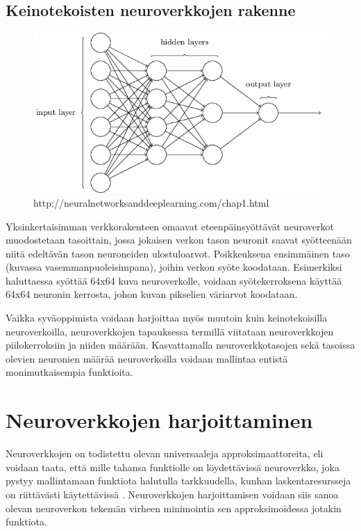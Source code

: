 \documentclass[finnish]{tktltiki2}
\theoremstyle{definition}
\theoremstyle{remark}
\begin{document}
  \subsection{Keinotekoisten neuroverkkojen rakenne}

  \begin{figure}[h]
  \label{pic:neuralnet}
  \centering
  \includegraphics[scale=0.5]{basic-neuralnet}
  \caption{http://neuralnetworksanddeeplearning.com/chap1.html}
  \end{figure}

  Yksinkertaisimman verkkorakenteen omaavat eteenpäinsyöttävät neuroverkot muodostetaan tasoittain, jossa jokaisen verkon tason neuronit saavat syötteenään niitä edeltävän tason neuroneiden ulostuloarvot. Poikkeuksena ensimmäinen taso (kuvassa vasemmanpuoleisimpana), joihin verkon syöte koodataan. Esimerkiksi haluttaessa syöttää 64x64 kuva neuroverkolle, voidaan syötekerroksena käyttää 64x64 neuronin kerrosta, johon kuvan pikselien väriarvot koodataan.

  Vaikka syväoppimista voidaan harjoittaa myös muutoin kuin keinotekoisilla neuroverkoilla, neuroverkkojen tapauksessa termillä viitataan neuroverkkojen piilokerroksiin ja niiden määrään. Kasvattamalla neuroverkkotasojen sekä tasoissa olevien neuronien määrää neuroverkoilla voidaan mallintaa entistä monimutkaisempia funktioita.

  \section{Neuroverkkojen harjoittaminen}

  Neuroverkkojen on todistettu olevan universaaleja approksimaattoreita, eli voidaan taata, että mille tahansa funktiolle on löydettävissä neuroverkko, joka pystyy mallintamaan funktiota halutulla tarkkuudella, kunhan laskentaresursseja on riittävästi käytettävissä \cite{multilayer-feedforward-universal-approximators}. Neuroverkkojen harjoittamisen voidaan siis sanoa olevan neuroverkon tekemän virheen minimointia sen approksimoidessa jotakin funktiota.
\end{document}
